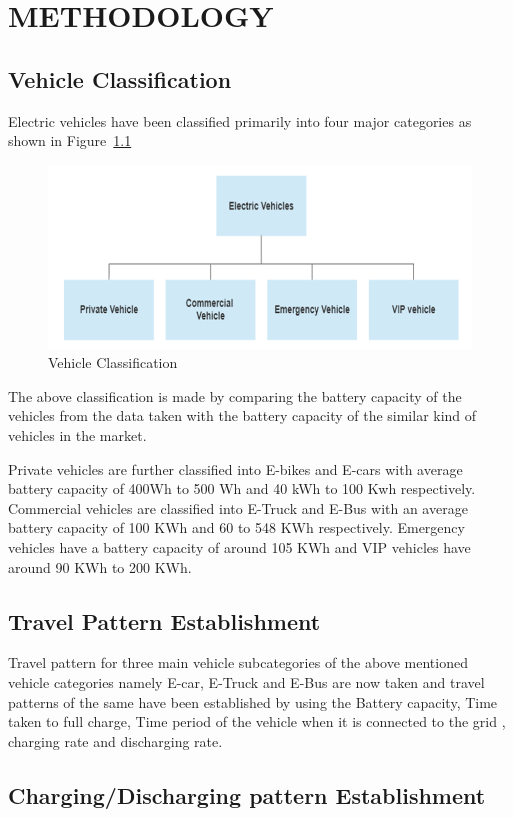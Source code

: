 	\chapter{METHODOLOGY}
	\label{chap:work}
	
	\section{Vehicle Classification}
	
	 Electric vehicles have been classified primarily into four major categories as shown in Figure~\ref{fig:classification} 
	 	
			\begin{figure}[h]
				\centering
				\includegraphics[width=0.7\linewidth]{classification}
				\caption{Vehicle Classification}
				\label{fig:classification}
			\end{figure}
		
	The above classification is made by comparing the battery capacity of the vehicles from the data taken with the battery capacity of the similar kind of vehicles in the market.

	\par {Private vehicles are further classified into E-bikes and E-cars with average battery capacity of 400Wh to 500 Wh and 40 kWh to 100 Kwh respectively. Commercial vehicles are classified into E-Truck and E-Bus with an average battery capacity of 100 KWh and 60 to 548 KWh respectively. Emergency vehicles have a battery capacity of around 105 KWh and VIP vehicles have around 90 KWh to 200 KWh.
	}
	
	\section{Travel Pattern Establishment}
	
	Travel pattern for three main vehicle subcategories of the above mentioned vehicle categories namely E-car, E-Truck and E-Bus are now taken and travel patterns of the same have been established by using the Battery capacity, Time taken to full charge, Time period of the vehicle when it is connected to the grid , charging rate and discharging rate\cite{evdata}.
	
	\section{Charging/Discharging pattern Establishment}